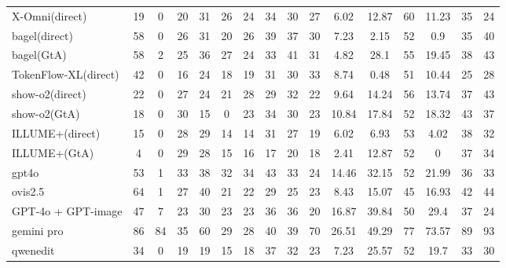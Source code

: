 \documentclass{article}
\theoremstyle{plain}
\theoremstyle{definition}
\theoremstyle{remark}
\begin{document}
\begin{table}[!htbp]
{\begin{tabular}{@{}lccccccccccccccc@{}}
X-Omni(direct) & 19 & 0 & 20 & 31 & 26 & 24 & 34 & 30 & 27 & 6.02 & 12.87 & 60 & 11.23 & 35 & 24 \\
bagel(direct) & 58 & 0 & 26 & 31 & 20 & 26 & 39 & 37 & 30 & 7.23 & 2.15 & 52 & 0.9 & 35 & 40 \\
bagel(GtA) & 58 & 2 & 25 & 36 & 27 & 24 & 33 & 41 & 31 & 4.82 & 28.1 & 55 & 19.45 & 38 & 43 \\
TokenFlow-XL(direct) & 42 & 0 & 16 & 24 & 18 & 19 & 31 & 30 & 33 & 8.74 & 0.48 & 51 & 10.44 & 25 & 28 \\
show-o2(direct) & 22 & 0 & 27 & 24 & 21 & 28 & 29 & 32 & 22 & 9.64 & 14.24 & 56 & 13.74 & 37 & 43 \\
show-o2(GtA) & 18 & 0 & 30 & 15 & 0 & 23 & 34 & 30 & 23 & 10.84 & 17.84 & 52 & 18.32 & 43 & 37 \\
ILLUME+(direct) & 15 & 0 & 28 & 29 & 14 & 14 & 31 & 27 & 19 & 6.02 & 6.93 & 53 & 4.02 & 38 & 32 \\
ILLUME+(GtA) & 4 & 0 & 29 & 28 & 15 & 16 & 17 & 20 & 18 & 2.41 & 12.87 & 52 & 0 & 37 & 34 \\
\midrule
\rowcolor{orange!8}
gpt4o & 53 & 1 & 33 & 38 & 32 & 34 & 43 & 33 & 24 & 14.46 & 32.15 & 52 & 21.99 & 36 & 33 \\
ovis2.5 & 64 & 1 & 27 & 40 & 21 & 22 & 29 & 25 & 23 & 8.43 & 15.07 & 45 & 16.93 & 42 & 44 \\
\midrule
GPT-4o + GPT-image & 47 & 7 & 23 & 30 & 23 & 23 & 36 & 36 & 20 & 16.87 & 39.84 & 50 & 29.4 & 37 & 24 \\
gemini pro & 86 & 84 & 35 & 60 & 29 & 28 & 40 & 39 & 70 & 26.51 & 49.29 & 77 & 73.57 & 89 & 93 \\
qwenedit & 34 & 0 & 19 & 19 & 15 & 18 & 37 & 32 & 23 & 7.23 & 25.57 & 52 & 19.7 & 33 & 30 \\
\bottomrule
\end{tabular}%
}
\end{table}
\end{document}
